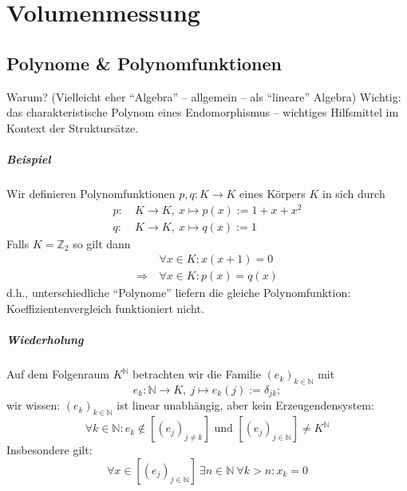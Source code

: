 \setcounter{chapter}{3}
\chapter{Volumenmessung}
\setcounter{section}{2}
\section{Polynome \& Polynomfunktionen}
	Warum? (Vielleicht eher "`Algebra"' -- allgemein -- als "`lineare"' Algebra) Wichtig: das charakteristische Polynom eines Endomorphismus -- wichtiges Hilfsmittel im Kontext der Struktursätze.
\paragraph{Beispiel}
	Wir definieren Polynomfunktionen $ p,q: K\to K $ eines Körpers $ K $ in sich durch 
		\begin{align*}
		p:\ & K\to K,\ x\mapsto p(x):= 1+x+x^2\\
		q:\ & K\to K,\ x\mapsto q(x):= 1
		\end{align*}
	Falls $ K=\mathbb{Z}_2 $ so gilt dann
		\begin{align*}
		&\forall x\in K: x(x+1)=0\\
		\Rightarrow\ &\forall x\in K: p(x) = q(x)
		\end{align*}
	d.h., unterschiedliche "`Polynome"' liefern die gleiche Polynomfunktion: Koeffizientenvergleich funktioniert nicht.
\paragraph{Wiederholung}
	Auf dem Folgenraum $ K^\mathbb{N} $ betrachten wir die Familie $ (e_k)_{k\in \mathbb{N}} $ mit
		\[ e_k :\mathbb{N}\to K,\ j\mapsto e_k(j):= \delta_{jk}; \]
	wir wissen: $ (e_k)_{k\in \mathbb{N}} $ ist linear unabhängig, aber kein Erzeugendensystem:
		\[ \forall k\in \mathbb{N}: e_k \notin [(e_j)_{j\neq k}] \text{ und }
		[(e_j)_{j\in\mathbb{N}}]\neq K^{\mathbb{N}}\]
	Insbesondere gilt:
		\[ \forall x\in [(e_j)_{j\in \mathbb{N}}]\ \exists n\in \mathbb{N}\ \forall k>n : x_k = 0 \]
